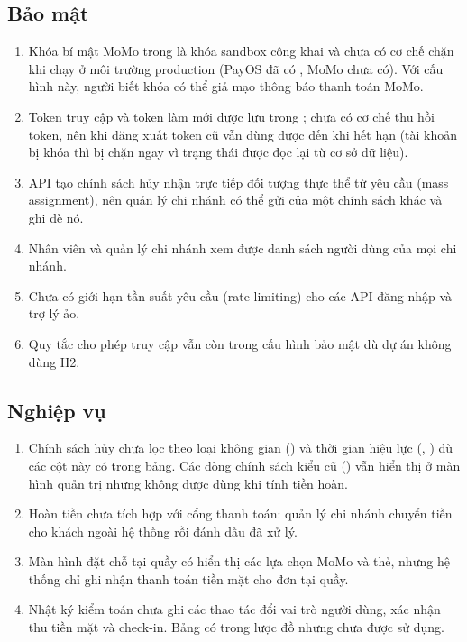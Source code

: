 \subsection{Bảo mật}
\begin{enumerate}
    \item Khóa bí mật MoMo trong  là khóa sandbox công khai và chưa có cơ chế chặn khi chạy ở môi trường production (PayOS đã có , MoMo chưa có). Với cấu hình này, người biết khóa có thể giả mạo thông báo thanh toán MoMo.
    \item Token truy cập và token làm mới được lưu trong ; chưa có cơ chế thu hồi token, nên khi đăng xuất token cũ vẫn dùng được đến khi hết hạn (tài khoản bị khóa thì bị chặn ngay vì trạng thái được đọc lại từ cơ sở dữ liệu).
    \item API tạo chính sách hủy nhận trực tiếp đối tượng thực thể từ yêu cầu (mass assignment), nên quản lý chi nhánh có thể gửi  của một chính sách khác và ghi đè nó.
    \item Nhân viên và quản lý chi nhánh xem được danh sách người dùng của mọi chi nhánh.
    \item Chưa có giới hạn tần suất yêu cầu (rate limiting) cho các API đăng nhập và trợ lý ảo.
    \item Quy tắc cho phép truy cập  vẫn còn trong cấu hình bảo mật dù dự án không dùng H2.
\end{enumerate}

\subsection{Nghiệp vụ}
\begin{enumerate}
    \item Chính sách hủy chưa lọc theo loại không gian () và thời gian hiệu lực (, ) dù các cột này có trong bảng. Các dòng chính sách kiểu cũ () vẫn hiển thị ở màn hình quản trị nhưng không được dùng khi tính tiền hoàn.
    \item Hoàn tiền chưa tích hợp với cổng thanh toán: quản lý chi nhánh chuyển tiền cho khách ngoài hệ thống rồi đánh dấu đã xử lý.
    \item Màn hình đặt chỗ tại quầy có hiển thị các lựa chọn MoMo và thẻ, nhưng hệ thống chỉ ghi nhận thanh toán tiền mặt cho đơn tại quầy.
    \item Nhật ký kiểm toán chưa ghi các thao tác đổi vai trò người dùng, xác nhận thu tiền mặt và check-in. Bảng  có trong lược đồ nhưng chưa được sử dụng.
\end{enumerate}

